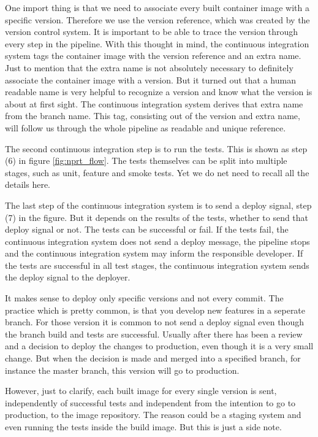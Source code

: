 One import thing is that we need to associate every built container image with a specific
version. Therefore we use the version reference, which was created by the version control
system. It is important to be able to trace the version through every step in the
pipeline. With this thought in mind, the continuous integration system tags the container
image with the version reference and an extra name. Just to mention that the extra name is
not absolutely necessary to definitely associate the container image with a version. But
it turned out that a human readable name is very helpful to recognize a version and know
what the version is about at first sight. The continuous integration system derives that
extra name from the branch name. This tag, consisting out of the version and extra name,
will follow us through the whole pipeline as readable and unique reference.

The second continuous integration step is to run the tests. This is shown as step (6) in
figure \ref{fig:nprt_flow}. The tests themselves can be split into multiple stages, such
as unit, feature and smoke tests. Yet we do net need to recall all the details here.

The last step of the continuous integration system is to send a deploy signal, step (7) in
the figure. But it depends on the results of the tests, whether to send that deploy signal
or not. The tests can be successful or fail. If the tests fail, the continuous integration
system does not send a deploy message, the pipeline stops and the continuous integration
system may inform the responsible developer. If the tests are successful in all test
stages, the continuous integration system sends the deploy signal to the deployer.

It makes sense to deploy only specific versions and not every commit. The practice which
is pretty common, is that you develop new features in a seperate branch. For those version
it is common to not send a deploy signal even though the branch build and tests are
successful. Usually after there has been a review and a decision to deploy the changes to
production, even though it is a very small change. But when the decision is made and
merged into a specified branch, for instance the master branch, this version will go to
production.

However, just to clarify, each built image for every single version is sent, independently
of successful tests and independent from the intention to go to production, to the image
repository. The reason could be a staging system and even running the tests inside the
build image. But this is just a side note.

